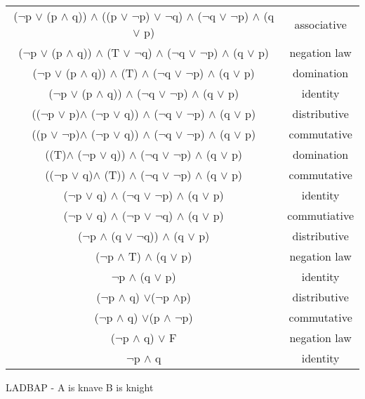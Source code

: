 \documentclass[h]{article}
\begin{document}
\begin{tabular}{|c c|}
($\neg$p $\vee$ (p $\wedge$ q)) $\wedge$ ((p $\vee$ $\neg$p) $\vee$ $\neg$q) $\wedge$ ($\neg $q $\vee$ $\neg$p) $\wedge$ (q $\vee$ p) & associative \\ 
($\neg$p $\vee$ (p $\wedge$ q)) $\wedge$ (T $\vee$ $\neg$q) $\wedge$ ($\neg $q $\vee$ $\neg$p) $\wedge$ (q $\vee$ p) & negation law \\ 
($\neg$p $\vee$ (p $\wedge$ q)) $\wedge$ (T) $\wedge$ ($\neg $q $\vee$ $\neg$p) $\wedge$ (q $\vee$ p) & domination \\ 
($\neg$p $\vee$ (p $\wedge$ q)) $\wedge$ ($\neg $q $\vee$ $\neg$p) $\wedge$ (q $\vee$ p) & identity \\ 
(($\neg$p $\vee$ p)$\wedge$ ($\neg$p $\vee$ q)) $\wedge$ ($\neg $q $\vee$ $\neg$p) $\wedge$ (q $\vee$ p) & distributive \\
((p $\vee$ $\neg$p)$\wedge$ ($\neg$p $\vee$ q)) $\wedge$ ($\neg $q $\vee$ $\neg$p) $\wedge$ (q $\vee$ p) & commutative \\
((T)$\wedge$ ($\neg$p $\vee$ q)) $\wedge$ ($\neg $q $\vee$ $\neg$p) $\wedge$ (q $\vee$ p) & domination \\
(($\neg$p $\vee$ q)$\wedge$ (T)) $\wedge$ ($\neg $q $\vee$ $\neg$p) $\wedge$ (q $\vee$ p) & commutative \\
($\neg$p $\vee$ q) $\wedge$ ($\neg $q $\vee$ $\neg$p) $\wedge$ (q $\vee$ p) & identity \\
($\neg$p $\vee$ q) $\wedge$ ($\neg $p $\vee$ $\neg$q) $\wedge$ (q $\vee$ p) & commutiative \\
($\neg$p $\wedge$ (q $\vee$ $\neg$q)) $\wedge$ (q $\vee$ p) & distributive \\
($\neg$p $\wedge$ T) $\wedge$ (q $\vee$ p) & negation law \\
$\neg$p $\wedge$ (q $\vee$ p) & identity  \\
($\neg$p $\wedge$ q) $\vee$($\neg$p $\wedge$p) & distributive  \\
($\neg$p $\wedge$ q) $\vee$(p $\wedge$ $\neg$p) & commutative  \\
($\neg$p $\wedge$ q) $\vee$ F & negation law  \\
$\neg$p $\wedge$ q & identity  \\ \hline
\end{tabular}\newline \newline
LADBAP - A is knave B is knight
\end{document}
